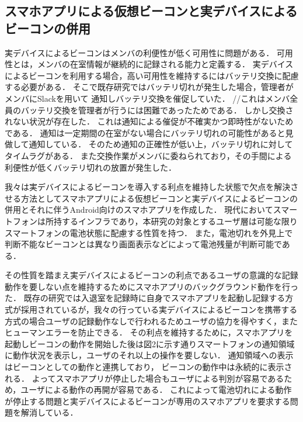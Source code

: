 
\subsection{スマホアプリによる仮想ビーコンと実デバイスによるビーコンの併用}



実デバイスによるビーコンはメンバの利便性が低く可用性に問題がある．
可用性とは，メンバの在室情報が継続的に記録される能力と定義する．
実デバイスによるビーコンを利用する場合，高い可用性を維持するにはバッテリ交換に配慮する必要がある．
そこで既存研究ではバッテリ切れが発生した場合，管理者がメンバにSlackを用いて
通知しバッテリ交換を催促していた．
//これはメンバ全員のバッテリ交換を管理者が行うには困難であったためである．
しかし交換されない状況が存在した．
これは通知による催促が不確実かつ即時性がないためである．
通知は一定期間の在室がない場合にバッテリ切れの可能性があると見做して通知している．
そのため通知の正確性が低い上，バッテリ切れに対してタイムラグがある．
また交換作業がメンバに委ねられており，その手間による利便性が低くバッテリ切れの放置が発生した．


我々は実デバイスによるビーコンを導入する利点を維持した状態で欠点を解決させる方法としてスマホアプリによる仮想ビーコンと実デバイスによるビーコンの併用とそれに伴うAndroid向けのスマホアプリを作成した．
 現代においてスマートフォンは所持するインフラであり，本研究の対象とするユーザ層は可能な限りスマートフォンの電池状態に配慮する性質を持つ．
また，電池切れを外見上で判断不能なビーコンとは異なり画面表示などによって電池残量が判断可能である．

その性質を踏まえ実デバイスによるビーコンの利点であるユーザの意識的な記録動作を要しない点を維持するためにスマホアプリのバックグラウンド動作を行った．
 既存の研究では入退室を記録時に自身でスマホアプリを起動し記録する方式が採用されているが，我々の行っている実デバイスによるビーコンを携帯する方式の場合ユーザの記録動作なしで行われるためユーザの協力を得やすく，またヒューマンエラーを防止できる．
その利点を維持するために，スマホアプリを起動しビーコンの動作を開始した後は図2に示す通りスマートフォンの通知領域に動作状況を表示し，ユーザのそれ以上の操作を要しない．
通知領域への表示はビーコンとしての動作と連携しており， ビーコンの動作中は永続的に表示される．
よってスマホアプリが停止した場合もユーザによる判別が容易であるため，ユーザによる動作の再開が容易である．
これによって電池切れによる動作が停止する問題と実デバイスによるビーコンが専用のスマホアプリを要求する問題を解消している．


